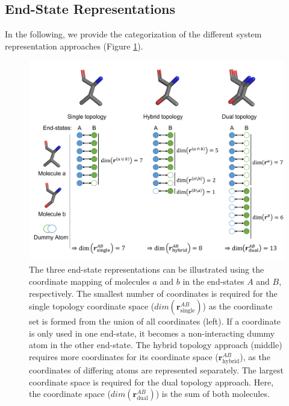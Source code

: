 \subsection{End-State Representations}
In the following, we provide the categorization of the different system representation approaches (Figure \ref{fig: AtomMapping}).

\begin{figure}[h!]
    \centering
    \includegraphics[width=\linewidth]{fig/theory/atomMappingSmallMols.png}
    \caption{The three end-state representations can be illustrated using the coordinate mapping of molecules $a$ and $b$ in the end-states $A$ and $B$, respectively. The smallest number of coordinates is required for the single topology coordinate space ($dim(\textbf{r}^{AB}_{\text{single}})$) as the coordinate set is formed from the union of all coordinates (left). If a coordinate is only used in one end-state, it becomes a non-interacting dummy atom in the other end-state. The hybrid topology approach (middle) requires more coordinates for its coordinate space ($\textbf{r}^{AB}_{\text{hybrid}}$), as the coordinates of differing atoms are represented separately. The largest coordinate space is required for the dual topology approach. Here, the coordinate space ($dim(\textbf{r}^{AB}_{\text{dual}})$) is the sum of both molecules.}
    \label{fig: AtomMapping}
\end{figure}

